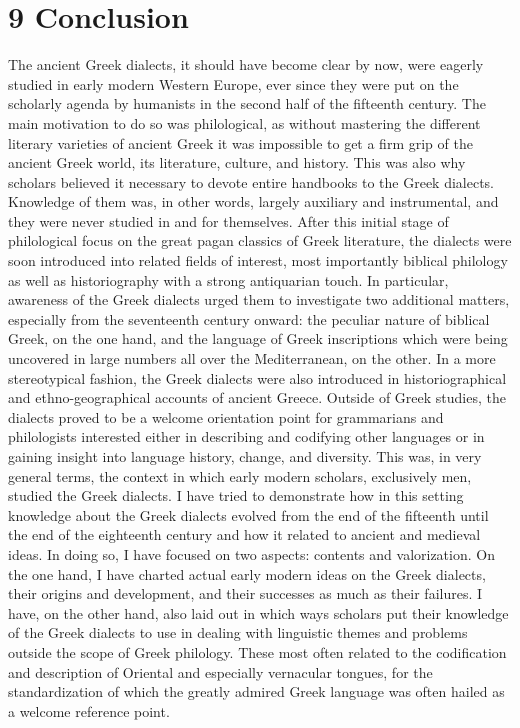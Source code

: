 \clearpage\section{9 Conclusion}
\hypertarget{Toc19704869}{}\begin{styleStandard}
The ancient Greek dialects, it should have become clear by now, were eagerly studied in early modern Western Europe, ever since they were put on the scholarly agenda by humanists in the second half of the fifteenth century. The main motivation to do so was philological, as without mastering the different literary varieties of ancient Greek it was impossible to get a firm grip of the ancient Greek world, its literature, culture, and history. This was also why scholars believed it necessary to devote entire handbooks to the Greek dialects. Knowledge of them was, in other words, largely auxiliary and instrumental, and they were never studied in and for themselves. After this initial stage of philological focus on the great pagan classics of Greek literature, the dialects were soon introduced into related fields of interest, most importantly biblical philology as well as historiography with a strong antiquarian touch. In particular, awareness of the Greek dialects urged them to investigate two additional matters, especially from the seventeenth century onward: the peculiar nature of biblical Greek, on the one hand, and the language of Greek inscriptions which were being uncovered in large numbers all over the Mediterranean, on the other. In a more stereotypical fashion, the Greek dialects were also introduced in historiographical and ethno-geographical accounts of ancient Greece. Outside of Greek studies, the dialects proved to be a welcome orientation point for grammarians and philologists interested either in describing and codifying other languages or in gaining insight into language history, change, and diversity. This was, in very general terms, the context in which early modern scholars, exclusively men, studied the Greek dialects. I have tried to demonstrate how in this setting knowledge about the Greek dialects evolved from the end of the fifteenth until the end of the eighteenth century and how it related to ancient and medieval ideas. In doing so, I have focused on two aspects: contents and valorization. On the one hand, I have charted actual early modern ideas on the Greek dialects, their origins and development, and their successes as much as their failures. I have, on the other hand, also laid out in which ways scholars put their knowledge of the Greek dialects to use in dealing with linguistic themes and problems outside the scope of Greek philology. These most often related to the codification and description of Oriental and especially vernacular tongues, for the standardization of which the greatly admired Greek language was often hailed as a welcome reference point.
\end{styleStandard}

